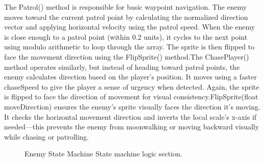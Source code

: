 \documentclass[12pt,oneside,openright,a4paper]{cpe-english-project}
\begin{document}
The Patrol() method is responsible for basic waypoint navigation. The enemy moves toward the current patrol point by calculating the normalized direction vector and applying horizontal velocity using the patrol speed. When the enemy is close enough to a patrol point (within 0.2 units), it cycles to the next point using modulo arithmetic to loop through the array. The sprite is then flipped to face the movement direction using the FlipSprite() method.The ChasePlayer() method operates similarly, but instead of heading toward patrol points, the enemy calculates direction based on the player's position. It moves using a faster chaseSpeed to give the player a sense of urgency when detected. Again, the sprite is flipped to face the direction of movement for visual consistency.FlipSprite(float moveDirection) ensures the enemy's sprite visually faces the direction it's moving. It checks the horizontal movement direction and inverts the local scale’s x-axis if needed—this prevents the enemy from moonwalking or moving backward visually while chasing or patrolling.\par 
 \begin{figure}[!h]
 \centering
\caption{Enemy State Machine State machine logic section.}\label{fig:ESMsm}
\end{figure}
\end{document}
